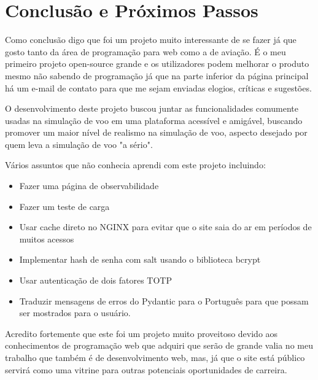 \chapter{Conclusão e Próximos Passos}

Como conclusão digo que foi um projeto muito interessante de se fazer já que 
gosto tanto da área de programação para web como a de aviação. É o meu primeiro 
projeto open-source grande e os utilizadores podem melhorar o produto mesmo não 
sabendo de programação já que na parte inferior da página principal há um e-mail 
de contato para que me sejam enviadas elogios, críticas e sugestões.

O desenvolvimento deste projeto buscou juntar as funcionalidades comumente usadas 
na simulação de voo em uma plataforma acessível e amigável, buscando promover um 
maior nível de realismo na simulação de voo, aspecto desejado por quem leva
a simulação de voo "a sério".

Vários assuntos que não conhecia aprendi com este projeto incluindo:

\begin{itemize}
\item Fazer uma página de observabilidade
\item Fazer um teste de carga
\item Usar cache direto no NGINX para evitar que o site saia do ar em períodos 
de muitos acessos
\item Implementar hash de senha com salt usando o biblioteca bcrypt
\item Usar autenticação de dois fatores TOTP
\item Traduzir mensagens de erros do Pydantic para o Português para que possam 
ser mostrados para o usuário.
\end{itemize}

Acredito fortemente que este foi um projeto muito proveitoso devido aos 
conhecimentos de programação web que adquiri que serão de grande valia no meu 
trabalho que também é de desenvolvimento web, mas, já que o site está público 
servirá como uma vitrine para outras potenciais oportunidades de carreira.